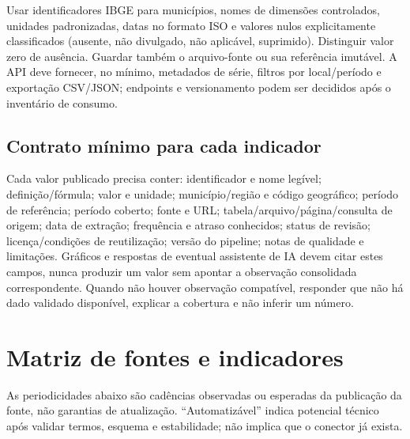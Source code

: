 \documentclass[12pt]{article}
\begin{document}
Usar identificadores IBGE para municípios, nomes de dimensões controlados, unidades padronizadas, datas no formato ISO e valores nulos explicitamente classificados (ausente, não divulgado, não aplicável, suprimido). Distinguir valor zero de ausência. Guardar também o arquivo-fonte ou sua referência imutável. A API deve fornecer, no mínimo, metadados de série, filtros por local/período e exportação CSV/JSON; endpoints e versionamento podem ser decididos após o inventário de consumo.

\subsection{Contrato mínimo para cada indicador}
Cada valor publicado precisa conter: identificador e nome legível; definição/fórmula; valor e unidade; município/região e código geográfico; período de referência; período coberto; fonte e URL; tabela/arquivo/página/consulta de origem; data de extração; frequência e atraso conhecidos; status de revisão; licença/condições de reutilização; versão do pipeline; notas de qualidade e limitações. Gráficos e respostas de eventual assistente de IA devem citar estes campos, nunca produzir um valor sem apontar a observação consolidada correspondente. Quando não houver observação compatível, responder que não há dado validado disponível, explicar a cobertura e não inferir um número.

\section{Matriz de fontes e indicadores}
As periodicidades abaixo são cadências observadas ou esperadas da publicação da fonte, não garantias de atualização. ``Automatizável'' indica potencial técnico após validar termos, esquema e estabilidade; não implica que o conector já exista.
\end{document}
